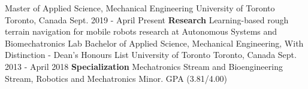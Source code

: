 \begin{cventries}
  \cventry
    {Master of Applied Science, Mechanical Engineering}
    {University of Toronto}
    {Toronto, Canada}
    {Sept. 2019 - April Present}
    {\textbf{Research} Learning-based rough terrain navigation for mobile robots research at Autonomous Systems and Biomechatronics Lab}
  \cventry
    {Bachelor of Applied Science, Mechanical Engineering, With Distinction - Dean's Honours List}
    {University of Toronto}
    {Toronto, Canada}
    {Sept. 2013 - April 2018}
    {\textbf{Specialization} Mechatronics Stream and Bioengineering Stream, Robotics and Mechatronics Minor. GPA (3.81/4.00)}
\end{cventries}
